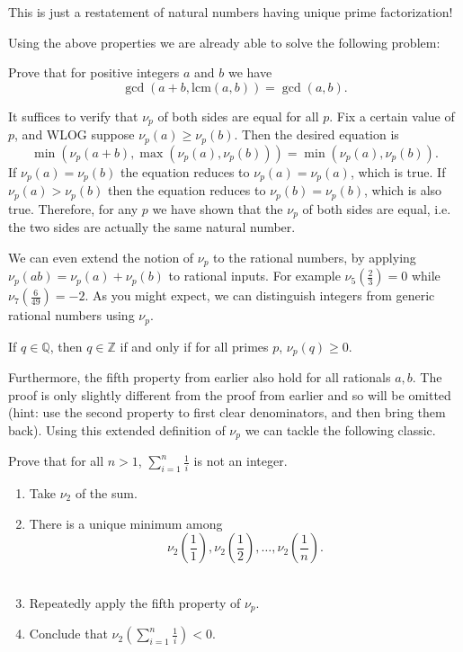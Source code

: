 \documentclass{article}
\begin{document}
\begin{pro}
    This is just a restatement of natural numbers having unique prime factorization!
\end{pro}

Using the above properties we are already able to solve the following problem:

\begin{exam}
    Prove that for positive integers $a$ and $b$ we have \[\gcd(a+b,\text{lcm}(a,b))=\gcd(a,b).\]
\end{exam}

\begin{sol}
    It suffices to verify that $\nu_p$ of both sides are equal for all $p$. Fix a certain value of $p$, and WLOG suppose $\nu_p(a) \geq \nu_p(b)$. Then the desired equation is \[\min(\nu_p(a+b), \max(\nu_p(a), \nu_p(b))) = \min(\nu_p(a), \nu_p(b)).\] If $\nu_p(a) = \nu_p(b)$ the equation reduces to $\nu_p(a) = \nu_p(a)$, which is true. If $\nu_p(a) > \nu_p(b)$ then the equation reduces to $\nu_p(b)=\nu_p(b)$, which is also true. Therefore, for any $p$ we have shown that the $\nu_p$ of both sides are equal, i.e. the two sides are actually the same natural number.
\end{sol}

\bigskip
We can even extend the notion of $\nu_p$ to the rational numbers, by applying $\nu_p(ab)=\nu_p(a)+\nu_p(b)$ to rational inputs. For example $\nu_5\left( \frac23 \right)=0$ while $\nu_7\left( \frac6{49} \right)=-2$. As you might expect, we can distinguish integers from generic rational numbers using $\nu_p$.

\begin{fact}
    If $q\in\mathbb Q$, then $q\in\mathbb Z$ if and only if for all primes $p$, $\nu_p(q)\geq 0$.
\end{fact}

Furthermore, the fifth property from earlier also hold for all rationals $a,b$. The proof is only slightly different from the proof from earlier and so will be omitted (hint: use the second property to first clear denominators, and then bring them back). Using this extended definition of $\nu_p$ we can tackle the following classic.

\begin{exam}[Classic]
    Prove that for all $n>1$, $\sum_{i=1}^n\frac1i$ is not an integer.
\end{exam}

\begin{walk}
    \begin{enumerate}
        \item Take $\nu_2$ of the sum.
        \item There is a unique minimum among \[\nu_2\left( \frac11 \right),\nu_2\left( \frac12 \right),\dots,\nu_2\left( \frac1n \right).\]\
        \item Repeatedly apply the fifth property of $\nu_p$.
        \item Conclude that $\nu_2\left( \sum_{i=1}^n\frac1i \right)<0$.
    \end{enumerate}
\end{walk}
\end{document}
